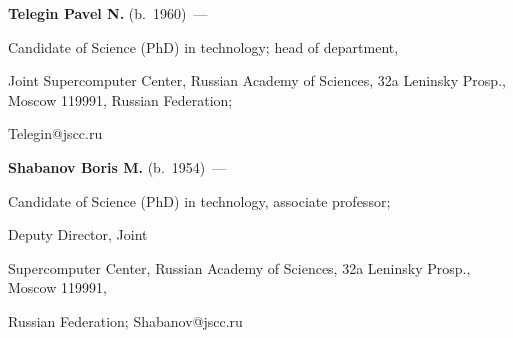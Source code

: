       \vspace*{3pt}





      \noindent


      \textbf{Telegin Pavel N.} (b.\ 1960)~---


      Candidate of Science (PhD) in technology; head of department,


      Joint Supercomputer Center, Russian Academy of Sciences, 32a Leninsky Prosp., Moscow 119991, Russian Federation;


Telegin@jscc.ru





 \label{end\stat}





      \vspace*{3pt}





      \noindent


      \textbf{Shabanov Boris M.} (b.\ 1954)~---


      Candidate of Science (PhD) in technology, associate professor;


      Deputy Director, Joint


Supercomputer Center, Russian Academy of Sciences, 32a Leninsky Prosp., Moscow 119991,


Russian Federation; Shabanov@jscc.ru











\renewcommand{\bibname}{\protect\rm Литература}